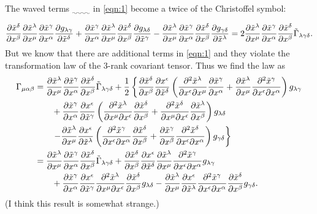 \documentclass[a4paper,pdftex,10pt]{article}
\begin{document}
The waved terms $\uwave{\qquad}$ in \eqref{eqn:1} become a twice of the Christoffel symbol:
\begin{equation}
  \pdv{\tilde{x}^{\delta}}{x^{\beta}}
  \pdv{\tilde{x}^{\lambda}}{x^{\mu}}\pdv{\tilde{x}^{\gamma}}{x^{\alpha}}
  \pdv{g_{\lambda\gamma}}{\tilde{x}^{\delta}}
  +
  \pdv{\tilde{x}^{\gamma}}{x^{\alpha}}
  \pdv{\tilde{x}^{\lambda}}{x^{\mu}}\pdv{\tilde{x}^{\delta}}{x^{\beta}}
  \pdv{g_{\lambda\delta}}{\tilde{x}^{\gamma}}
  -
  \pdv{\tilde{x}^{\lambda}}{x^{\mu}}
  \pdv{\tilde{x}^{\gamma}}{x^{\alpha}}\pdv{\tilde{x}^{\delta}}{x^{\beta}}
  \pdv{g_{\gamma\delta}}{\tilde{x}^{\lambda}}
  =
  2
  \pdv{\tilde{x}^{\lambda}}{x^{\mu}}
  \pdv{\tilde{x}^{\gamma}}{x^{\alpha}}\pdv{\tilde{x}^{\delta}}{x^{\beta}}
  \tilde{\Gamma}_{\lambda\gamma\delta}
  .
\end{equation}
But we know that there are additional terms in \eqref{eqn:1} and they violate the transformation law of the 3-rank covariant tensor. Thus we find the law as
\begin{align}
  \Gamma_{\mu\alpha\beta}
   & =
  \pdv{\tilde{x}^{\lambda}}{x^{\mu}}
  \pdv{\tilde{x}^{\gamma}}{x^{\alpha}}\pdv{\tilde{x}^{\delta}}{x^{\beta}}
  \tilde{\Gamma}_{\lambda\gamma\delta}
  +
  \frac{1}{2}
  \left\{
  \pdv{\tilde{x}^{\delta}}{x^{\beta}}\pdv{x^{\epsilon}}{\tilde{x}^{\delta}}
  \left(
  \pdv{\tilde{x}^{\lambda}}{x^{\epsilon}}{x^{\mu}}\pdv{\tilde{x}^{\gamma}}{x^{\alpha}}
  +
  \pdv{\tilde{x}^{\lambda}}{x^{\mu}}\pdv{\tilde{x}^{\gamma}}{x^{\epsilon}}{x^{\alpha}}
  \right)g_{\lambda\gamma}
  \right.
  \nonumber
  \\
   & \qquad
  +
  \pdv{\tilde{x}^{\gamma}}{x^{\alpha}}\pdv{x^{\epsilon}}{\tilde{x}^{\gamma}}
  \left(
  \pdv{\tilde{x}^{\lambda}}{x^{\mu}}{x^{\epsilon}}
  \pdv{\tilde{x}^{\delta}}{x^{\beta}}
  +
  \pdv{\tilde{x}^{\delta}}{x^{\mu}}{x^{\epsilon}}\pdv{\tilde{x}^{\lambda}}{x^{\beta}}
  \right)
  g_{\lambda\delta}
  \nonumber
  \\
   & \qquad
  \left.
  -
  \pdv{\tilde{x}^{\lambda}}{x^{\mu}}\pdv{x^{\epsilon}}{\tilde{x}^{\lambda}}
  \left(
  \pdv{\tilde{x}^{\gamma}}{x^{\epsilon}}{x^{\alpha}}\pdv{\tilde{x}^{\delta}}{x^{\beta}}
  +
  \pdv{\tilde{x}^{\gamma}}{x^{\beta}}\pdv{\tilde{x}^{\delta}}{x^{\epsilon}}{x^{\alpha}}
  \right)
  g_{\gamma\delta}
  \right\}
  \nonumber
  \\
   & =
  \pdv{\tilde{x}^{\lambda}}{x^{\mu}}
  \pdv{\tilde{x}^{\gamma}}{x^{\alpha}}\pdv{\tilde{x}^{\delta}}{x^{\beta}}
  \tilde{\Gamma}_{\lambda\gamma\delta}
  +
  \pdv{\tilde{x}^{\delta}}{x^{\beta}}\pdv{x^{\epsilon}}{\tilde{x}^{\delta}}
  \pdv{\tilde{x}^{\lambda}}{x^{\mu}}\pdv{\tilde{x}^{\gamma}}{x^{\epsilon}}{x^{\alpha}}
  g_{\lambda\gamma}
  \nonumber
  \\
   & \qquad
  +
  \pdv{\tilde{x}^{\gamma}}{x^{\alpha}}\pdv{x^{\epsilon}}{\tilde{x}^{\gamma}}
  \pdv{\tilde{x}^{\lambda}}{x^{\mu}}{x^{\epsilon}}
  \pdv{\tilde{x}^{\delta}}{x^{\beta}}
  g_{\lambda\delta}
  -
  \pdv{\tilde{x}^{\lambda}}{x^{\mu}}\pdv{x^{\epsilon}}{\tilde{x}^{\lambda}}
  \pdv{\tilde{x}^{\gamma}}{x^{\epsilon}}{x^{\alpha}}\pdv{\tilde{x}^{\delta}}{x^{\beta}}
  g_{\gamma\delta}
  .
\end{align}
(I think this result is somewhat strange.)
\end{document}
